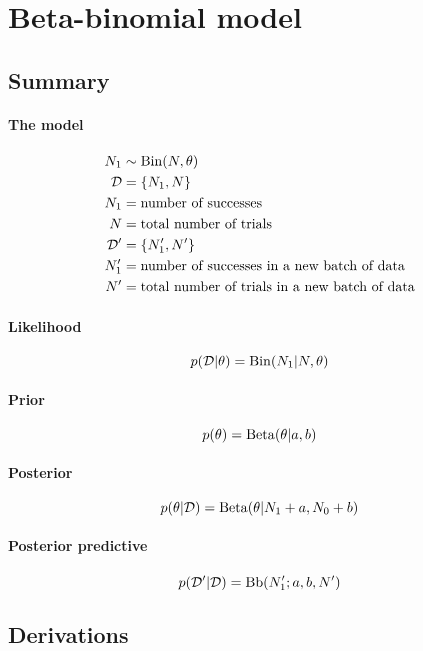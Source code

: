 \section{Beta-binomial model}
\subsection{Summary}
\paragraph{The model}
    \begin{align}
        N_1         &\sim \operatorname{Bin}(N, \theta) \\
        \mathcal D  &= \{N_1, N\} \\
        N_1         &= \text{number of successes} \\
        N           &= \text{total number of trials} \\
        \mathcal D' &= \{N_1', N'\} \\
        N_1'        &= \text{number of successes in a new batch of data} \\
        N'          &= \text{total number of trials in a new batch of data}
    \end{align}

\paragraph{Likelihood}
    \begin{equation}
        p(\mathcal D | \theta) = \operatorname{Bin}(N_1 | N, \theta)
    \end{equation}

\paragraph{Prior}
    \begin{equation}
        p(\theta)   = \operatorname{Beta}(\theta | a, b)
    \end{equation}

\paragraph{Posterior}
    \begin{equation}
        p(\theta | \mathcal D) = \operatorname{Beta}(\theta | N_1 + a, N_0 + b)
    \end{equation}

\paragraph{Posterior predictive}
    \begin{equation}
        p(\mathcal D' | \mathcal D) = \operatorname{Bb}(N_1'; a, b, N')
    \end{equation}

\subsection{Derivations}